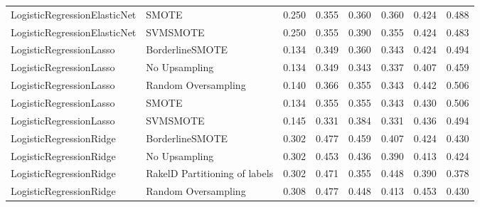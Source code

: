 \begin{tabular}{llllllll}
   LogisticRegressionElasticNet &                         SMOTE & 0.250 &                     0.355 &                 0.360 &                  0.360 &                                   0.424 &    0.488 \\
   LogisticRegressionElasticNet &                      SVMSMOTE & 0.250 &                     0.355 &                 0.390 &                  0.355 &                                   0.424 &    0.483 \\
        LogisticRegressionLasso &               BorderlineSMOTE & 0.134 &                     0.349 &                 0.360 &                  0.343 &                                   0.424 &    0.494 \\
        LogisticRegressionLasso &                 No Upsampling & 0.134 &                     0.349 &                 0.343 &                  0.337 &                                   0.407 &    0.459 \\
        LogisticRegressionLasso &           Random Oversampling & 0.140 &                     0.366 &                 0.355 &                  0.343 &                                   0.442 &    0.506 \\
        LogisticRegressionLasso &                         SMOTE & 0.134 &                     0.355 &                 0.355 &                  0.343 &                                   0.430 &    0.506 \\
        LogisticRegressionLasso &                      SVMSMOTE & 0.145 &                     0.331 &                 0.384 &                  0.331 &                                   0.436 &    0.494 \\
        LogisticRegressionRidge &               BorderlineSMOTE & 0.302 &                     0.477 &                 0.459 &                  0.407 &                                   0.424 &    0.430 \\
        LogisticRegressionRidge &                 No Upsampling & 0.302 &                     0.453 &                 0.436 &                  0.390 &                                   0.413 &    0.424 \\
        LogisticRegressionRidge & RakelD Partitioning of labels & 0.302 &                     0.471 &                 0.355 &                  0.448 &                                   0.390 &    0.378 \\
        LogisticRegressionRidge &           Random Oversampling & 0.308 &                     0.477 &                 0.448 &                  0.413 &                                   0.453 &    0.430 \\

\end{tabular}
